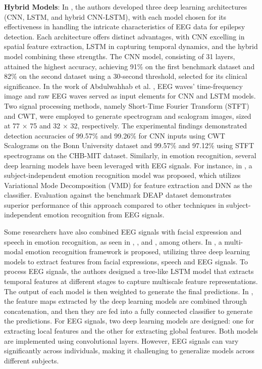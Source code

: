 \documentclass[preprint,12pt]{elsarticle}
\begin{document}
\textbf{Hybrid Models}: In \citep{hermawan_multi_2024}, the authors developed three deep learning architectures (CNN, LSTM, and hybrid CNN-LSTM), with each model chosen for its effectiveness in handling the intricate characteristics of EEG data for epilepsy detection. Each architecture offers distinct advantages, with CNN excelling in spatial feature extraction, LSTM in capturing temporal dynamics, and the hybrid model combining these strengths. The CNN model, consisting of 31 layers, attained the highest accuracy, achieving 91\% on the first benchmark dataset and 82\% on the second dataset using a 30-second threshold, selected for its clinical significance. In the work of Abdulwahhab et al. \citep{abdulwahhab_detection_2024}, EEG waves' time-frequency image and raw EEG waves served as input elements for CNN and LSTM models. Two signal processing methods, namely Short-Time Fourier Transform (STFT) and CWT, were employed to generate spectrogram and scalogram images, sized at 77 × 75 and 32 × 32, respectively. The experimental findings demonstrated detection accuracies of 99.57\% and 99.26\% for CNN inputs using CWT Scalograms on the Bonn University dataset and 99.57\% and 97.12\% using STFT spectrograms on the CHB-MIT dataset. Similarly, in emotion recognition, several deep learning models have been leveraged with EEG signals. For instance, in \citep{pandey_subject_2022},  a subject-independent emotion recognition model was proposed, which utilizes Variational Mode Decomposition (VMD) for feature extraction and DNN as the classifier. Evaluation against the benchmark DEAP dataset demonstrates superior performance of this approach compared to other techniques in subject-independent emotion recognition from EEG signals. 

Some researchers have also combined EEG signals with facial expression and speech in emotion recognition, as seen in \citep{hassouneh_development_2020}, \citep{pan_multimodal_2024}, and \citep{wang_multimodal_2023}, among others. In \citep{pan_multimodal_2024}, a multi-modal emotion recognition framework is proposed, utilizing three deep learning models to extract features from facial expressions, speech and EEG signals. To process EEG signals, the authors designed a tree-like LSTM model that extracts temporal features at different stages to capture multiscale feature representations. The output of each model is then weighted to generate the final predictions. In \citep{wang_multimodal_2023}, the feature maps extracted by the deep learning models are combined through concatenation, and then they are fed into a fully connected classifier to generate the predictions. For EEG signals, two deep learning models are designed: one for extracting local features and the other for extracting global features. Both models are implemented using convolutional layers. However, EEG signals can vary significantly across individuals, making it challenging to generalize models across different subjects.
\end{document}
